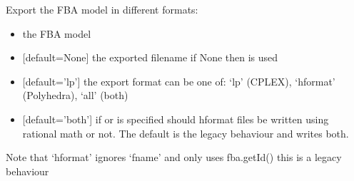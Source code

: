 \documentclass[letterpaper,10pt,english]{sphinxmanual}
\begin{document}
\begin{fulllineitems}
\label{\detokenize{modules_doc:cbmpy.CBWrite.exportModel}}
\pysigstartsignatures
{}
\pysigstopsignatures
\sphinxAtStartPar
Export the FBA model in different formats:
\begin{itemize}
\item {} 
\sphinxAtStartPar
{} the FBA model

\item {} 
\sphinxAtStartPar
{} {[}default=None{]} the exported filename if None then  is used

\item {} 
\sphinxAtStartPar
{} {[}default=’lp’{]} the export format can be one of: ‘lp’ (CPLEX), ‘hformat’ (Polyhedra), ‘all’ (both)

\item {} 
\sphinxAtStartPar
{} {[}default=’both’{]} if  or  is specified should hformat files be written using rational math or not. The default  is the legacy behaviour and writes both.

\end{itemize}

\sphinxAtStartPar
Note that ‘hformat’ ignores ‘fname’ and only uses fba.getId() this is a legacy behaviour

\end{fulllineitems}

\end{document}
